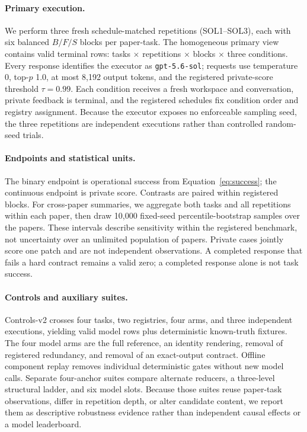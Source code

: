 \paragraph{Primary execution.}
We perform three fresh schedule-matched repetitions (SOL1--SOL3), each with six balanced $B/F/S$ blocks per paper-task. The homogeneous primary view contains \PrimaryRows{} valid terminal rows: \PrimaryTasks{} tasks $\times$ \PrimaryRepeats{} repetitions $\times$ \PrimaryBlocksPerRepeat{} blocks $\times$ three conditions. Every response identifies the executor as \texttt{gpt-5.6-sol}; requests use temperature 0, top-$p$ 1.0, at most 8,192 output tokens, and the registered private-score threshold $\tau=0.99$. Each condition receives a fresh workspace and conversation, private feedback is terminal, and the registered schedules fix condition order and registry assignment. Because the executor exposes no enforceable sampling seed, the three repetitions are independent executions rather than controlled random-seed trials.

\paragraph{Endpoints and statistical units.}
The binary endpoint is operational success from Equation~\ref{eq:success}; the continuous endpoint is private score. Contrasts are paired within registered blocks. For cross-paper summaries, we aggregate both tasks and all repetitions within each paper, then draw 10,000 fixed-seed percentile-bootstrap samples over the \PrimaryPapers{} papers. These intervals describe sensitivity within the registered benchmark, not uncertainty over an unlimited population of papers. Private cases jointly score one patch and are not independent observations. A completed response that fails a hard contract remains a valid zero; a completed response alone is not task success.

\paragraph{Controls and auxiliary suites.}
Controls-v2 crosses four tasks, two registries, four arms, and three independent executions, yielding \ControlRows{} valid model rows plus \ControlDeterministicCells{} deterministic known-truth fixtures. The four model arms are the full reference, an identity rendering, removal of registered redundancy, and removal of an exact-output contract. Offline component replay removes individual deterministic gates without new model calls. Separate four-anchor suites compare alternate reducers, a three-level structural ladder, and six model slots. Because those suites reuse paper-task observations, differ in repetition depth, or alter candidate content, we report them as descriptive robustness evidence rather than independent causal effects or a model leaderboard.

